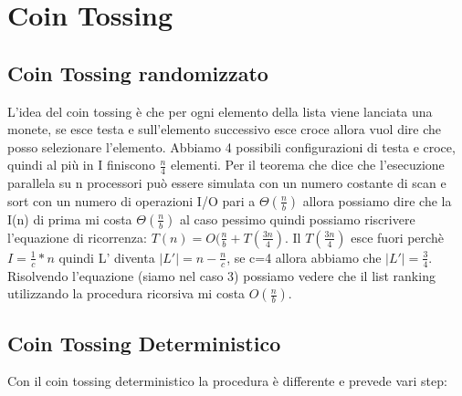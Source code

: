 \documentclass[14pt]{extreport}
\begin{document}
\section{Coin Tossing}

\subsection{Coin Tossing randomizzato}

L'idea del coin tossing è che per ogni elemento della lista viene lanciata una monete, se esce testa e sull'elemento successivo esce croce allora vuol dire che posso selezionare l'elemento. Abbiamo 4 possibili configurazioni di testa e croce, quindi al più in I finiscono $\frac{n}{4}$ elementi.
Per il teorema che dice che l'esecuzione parallela su n processori può essere simulata con un numero costante di scan e sort con un numero di operazioni I/O pari a $\Theta(\frac{n}{b})$ allora possiamo dire che la I(n) di prima mi costa $\Theta(\frac{n}{b})$ al caso pessimo quindi possiamo riscrivere l'equazione di ricorrenza:
$T(n) = O(\frac{n}{b} + T(\frac{3n}{4})$.
Il $T(\frac{3n}{4})$ esce fuori perchè $I=\frac{1}{c}*n$ quindi L' diventa $|L'| = n - \frac{n}{c}$, se c=4 allora abbiamo che $|L'| = \frac{3}{4}$.
Risolvendo l'equazione (siamo nel caso 3) possiamo vedere che il list ranking utilizzando la procedura ricorsiva mi costa $O(\frac{n}{b})$.

\subsection{Coin Tossing Deterministico}

Con il coin tossing deterministico la procedura è differente e prevede vari step:
\end{document}

